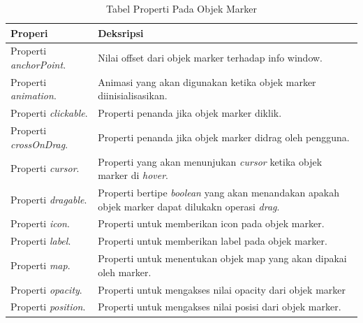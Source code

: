 \begin{table}[H] 
	\centering 
	\caption{Tabel Properti Pada Objek Marker}
	\label{tab:radioPackages}
	\begin{tabular}{|p{8cm}|p{8cm}|}
	\hline
		Properi & Deksripsi \\
    \hline
    	Properti \textit{anchorPoint}.& Nilai offset dari objek marker terhadap info window. \\
    	Properti \textit{animation}.  & Animasi yang akan digunakan ketika objek marker diinisialisasikan.  \\
    	Properti \textit{clickable}.  & Properti penanda jika objek marker diklik.  \\
    	Properti \textit{crossOnDrag}.  & Properti penanda jika objek marker didrag oleh pengguna. \\
    	Properti \textit{cursor}.  & Properti yang akan menunjukan \textit{cursor}  ketika objek marker di \textit{hover}. \\
    	Properti \textit{dragable}.  & Properti bertipe \textit{boolean} yang akan menandakan apakah objek marker dapat dilukakn operasi \textit{drag}. \\
    	Properti \textit{icon}.  & Properti untuk memberikan icon pada objek marker. \\
    	Properti \textit{label}.  & Properti untuk memberikan label pada objek marker. \\
    	Properti \textit{map}.  & Properti untuk menentukan objek map yang akan dipakai oleh marker. \\
    	Properti \textit{opacity}.  & Properti untuk mengakses nilai opacity dari objek marker \\
    	Properti \textit{position}.  & Properti untuk mengakses nilai posisi dari objek marker. \\
		\hline
	\end{tabular} 
\end{table}

